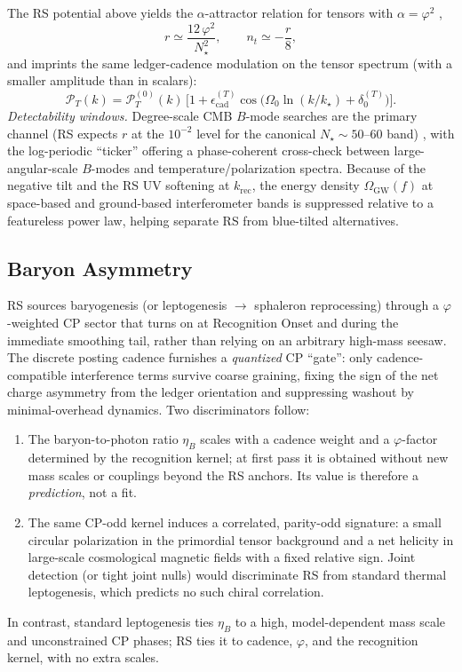 \documentclass[11pt]{article}
\theoremstyle{definition}
\theoremstyle{remark}
\begin{document}
The RS potential above yields the \(\alpha\)-attractor relation for tensors with \(\alpha=\varphi^2\) \citep{KalloshLinde2013},
\begin{equation}
\label{eq:tensors}
r \simeq \frac{12\,\varphi^2}{N_\star^2},\qquad n_t \simeq -\frac{r}{8},
\end{equation}
and imprints the same ledger-cadence modulation on the tensor spectrum (with a smaller amplitude than in scalars):
\[
\mathcal P_T(k)=\mathcal P_T^{(0)}(k)\,\Big[1+\epsilon^{(T)}_{\mathrm{cad}}\cos\!\big(\Omega_0\ln(k/k_\star)+\delta^{(T)}_0\big)\Big].
\]
\emph{Detectability windows.} Degree-scale CMB \(B\)-mode searches are the primary channel (RS expects \(r\) at the \(10^{-2}\) level for the canonical \(N_\star\sim 50\text{--}60\) band) \citep{BICEPKeck2021}, with the log-periodic “ticker” offering a phase-coherent cross-check between large-angular-scale \(B\)-modes and temperature/polarization spectra. Because of the negative tilt and the RS UV softening at \(k_{\mathrm{rec}}\), the energy density \(\Omega_{\mathrm{GW}}(f)\) at space-based and ground-based interferometer bands is suppressed relative to a featureless power law, helping separate RS from blue-tilted alternatives.

\subsection{Baryon Asymmetry}

RS sources baryogenesis (or leptogenesis \(\rightarrow\) sphaleron reprocessing) through a \(\varphi\)-weighted CP sector that turns on at Recognition Onset and during the immediate smoothing tail, rather than relying on an arbitrary high-mass seesaw. The discrete posting cadence furnishes a \emph{quantized} CP “gate”: only cadence-compatible interference terms survive coarse graining, fixing the sign of the net charge asymmetry from the ledger orientation and suppressing washout by minimal-overhead dynamics. Two discriminators follow:
\begin{enumerate}
  \item The baryon-to-photon ratio \(\eta_B\) scales with a cadence weight and a \(\varphi\)-factor determined by the recognition kernel; at first pass it is obtained without new mass scales or couplings beyond the RS anchors. Its value is therefore a \emph{prediction}, not a fit.
  \item The same CP-odd kernel induces a correlated, parity-odd signature: a small circular polarization in the primordial tensor background and a net helicity in large-scale cosmological magnetic fields with a fixed relative sign. Joint detection (or tight joint nulls) would discriminate RS from standard thermal leptogenesis, which predicts no such chiral correlation.
\end{enumerate}
In contrast, standard leptogenesis ties \(\eta_B\) to a high, model-dependent mass scale and unconstrained CP phases; RS ties it to cadence, \(\varphi\), and the recognition kernel, with no extra scales.
\end{document}
